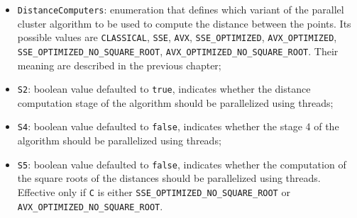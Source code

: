 \documentclass{article}
\begin{document}
\begin{itemize}
    \item
    \texttt{DistanceComputers}: enumeration that defines which variant of
    the parallel cluster algorithm to be used to compute the distance
    between the points. Its possible values are \texttt{CLASSICAL},
    \texttt{SSE}, \texttt{AVX}, \texttt{SSE\_OPTIMIZED},
    \texttt{AVX\_OPTIMIZED}, \texttt{SSE\_OPTIMIZED\_NO\_SQUARE\_ROOT},
    \texttt{AVX\_OPTIMIZED\_NO\_SQUARE\_ROOT}. Their meaning are described
    in the previous chapter;
    \item
    \texttt{S2}: boolean value defaulted to \texttt{true}, indicates
    whether the distance computation stage of the algorithm should be
    parallelized using threads;
    \item
    \texttt{S4}: boolean value defaulted to \texttt{false}, indicates
    whether the stage 4 of the algorithm should be parallelized using
    threads;
    \item
    \texttt{S5}: boolean value defaulted to \texttt{false}, indicates
    whether the computation of the square roots of the distances should be
    parallelized using threads. Effective only if \texttt{C} is either
    \texttt{SSE\_OPTIMIZED\_NO\_SQUARE\_ROOT} or
    \texttt{AVX\_OPTIMIZED\_NO\_SQUARE\_ROOT}.
\end{itemize}
\end{document}
